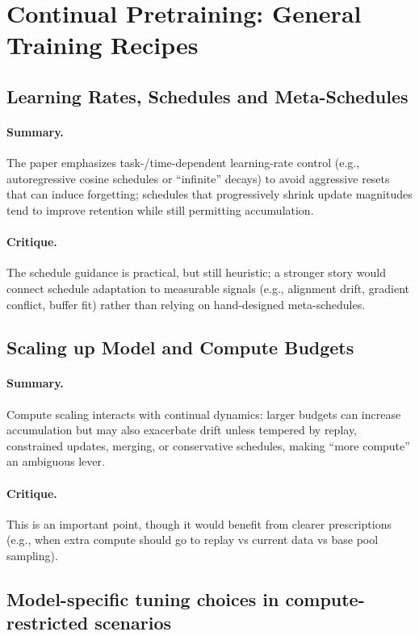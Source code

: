 \documentclass[12pt]{article}
\begin{document}
\section{Continual Pretraining: General Training Recipes}
\subsection{Learning Rates, Schedules and Meta-Schedules}
\paragraph{Summary.} The paper emphasizes task-/time-dependent learning-rate control (e.g., autoregressive
cosine schedules or “infinite” decays) to avoid aggressive resets that can induce forgetting; schedules that
progressively shrink update magnitudes tend to improve retention while still permitting accumulation.
\paragraph{Critique.} The schedule guidance is practical, but still heuristic; a stronger story would connect
schedule adaptation to measurable signals (e.g., alignment drift, gradient conflict, buffer fit) rather than
relying on hand-designed meta-schedules.

\subsection{Scaling up Model and Compute Budgets}
\paragraph{Summary.} Compute scaling interacts with continual dynamics: larger budgets can increase
accumulation but may also exacerbate drift unless tempered by replay, constrained updates, merging, or
conservative schedules, making “more compute” an ambiguous lever.
\paragraph{Critique.} This is an important point, though it would benefit from clearer prescriptions (e.g.,
when extra compute should go to replay vs current data vs base pool sampling).

\subsection{Model-specific tuning choices in compute-restricted scenarios}
\end{document}
